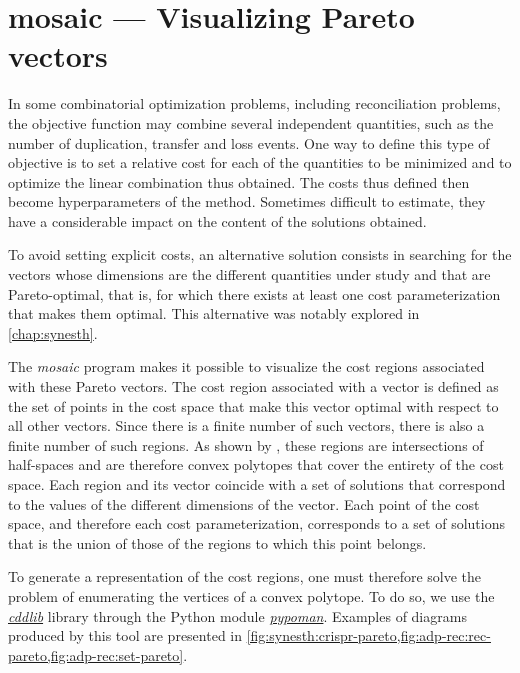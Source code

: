 \section{mosaic --- Visualizing Pareto vectors}

In some combinatorial optimization problems, including reconciliation problems, the objective function may combine several independent quantities, such as the number of duplication, transfer and loss events.
One way to define this type of objective is to set a relative cost for each of the quantities to be minimized and to optimize the linear combination thus obtained.
The costs thus defined then become hyperparameters of the method.
Sometimes difficult to estimate, they have a considerable impact on the content of the solutions obtained.

To avoid setting explicit costs, an alternative solution consists in searching for the vectors whose dimensions are the different quantities under study and that are Pareto-optimal, that is, for which there exists at least one cost parameterization that makes them optimal.
This alternative was notably explored in \cref{chap:synesth}.

The \emph{mosaic} program makes it possible to visualize the cost regions associated with these Pareto vectors.
The cost region associated with a vector is defined as the set of points in the cost space that make this vector optimal with respect to all other vectors.
Since there is a finite number of such vectors, there is also a finite number of such regions.
As shown by \textcite{LibeskindHadas2014ParetoOptimalPhylogenetic}, these regions are intersections of half-spaces and are therefore convex polytopes that cover the entirety of the cost space.
Each region and its vector coincide with a set of solutions that correspond to the values of the different dimensions of the vector.
Each point of the cost space, and therefore each cost parameterization, corresponds to a set of solutions that is the union of those of the regions to which this point belongs.

To generate a representation of the cost regions, one must therefore solve the problem of enumerating the vertices of a convex polytope.
To do so, we use the \emph{\href{https://github.com/cddlib/cddlib}{cddlib}} library through the Python module \emph{\href{https://github.com/stephane-caron/pypoman}{pypoman}}.
Examples of diagrams produced by this tool are presented in \cref{fig:synesth:crispr-pareto,fig:adp-rec:rec-pareto,fig:adp-rec:set-pareto}.
